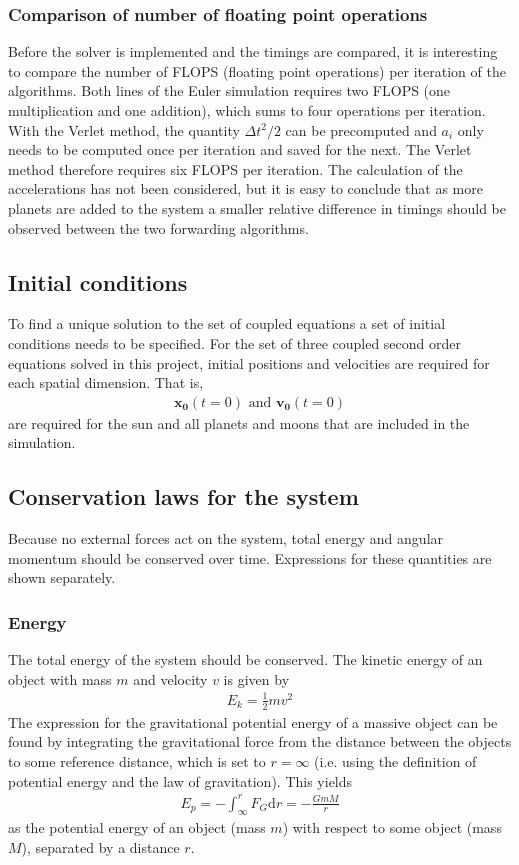 \documentclass[aps,reprint]{revtex4-1}
\begin{document}
\subsubsection{Comparison of number of floating point operations}
Before the solver is implemented and the timings are compared, it is interesting
to compare the number of FLOPS (floating point operations) per iteration of the
algorithms. Both lines of the Euler simulation requires two FLOPS (one
multiplication and one addition), which sums to four operations per iteration.
With the Verlet method, the quantity $\Delta{t}^2 / 2$ can be precomputed and
$a_{i}$ only needs to be computed once per iteration and saved for the next.
The Verlet method therefore requires six FLOPS per iteration. The calculation
of the accelerations has not been considered, but it is easy to conclude that
as more planets are added to the system a smaller relative difference in timings
should be observed between the two forwarding algorithms.
\subsection{Initial conditions}
To find a unique solution to the set of coupled equations a set of initial conditions needs
to be specified. For the set of three coupled second order equations solved in this project,
initial positions and velocities are required for each spatial dimension. That is,
\begin{align*}
 \mathbf{x_0}(t = 0) \text{ and } \mathbf{v_0}(t = 0)
\end{align*}
are required for the sun and all planets and moons that are included in the simulation.

\subsection{Conservation laws for the system}
Because no external forces act on the system, total energy and angular momentum should
be conserved over time. Expressions for these quantities are shown separately.
\subsubsection{Energy}
The total energy of the system should be conserved. The kinetic energy of an object with
mass $m$ and velocity $v$ is given by
\begin{align*}
 E_k = \frac{1}{2}m v^2
\end{align*}
The expression for the gravitational potential energy of a massive object can be found by
integrating the gravitational force from the distance between the objects to some reference
distance, which is set to $r = \infty$ (i.e. using the definition of potential energy and the law
of gravitation). This yields
\begin{align*}
  \label{eq:potentialenergy}
 E_p = -\int_\infty^r F_G \text{d} r = -\frac{GmM}{r}
\end{align*}
as the potential energy of an object (mass $m$) with respect to some object (mass $M$),
separated by a distance $r$.
\end{document}
